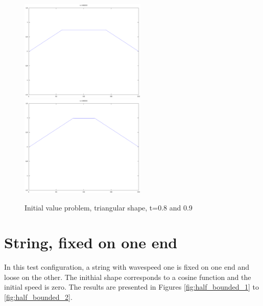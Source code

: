 \documentclass[a4paper,10pt]{report}
\begin{document}
\begin{figure}
 \includegraphics[width=6cm]{./fixed_ends_analytic_t1.800000.eps}
\includegraphics[width=6cm]{./fixed_ends_analytic_t1.900000.eps}

\caption{Initial value problem, triangular shape, t=0.8 and 0.9}
\label{fig:bounded_2}
\end{figure} 

\section{String, fixed on one end}
In this test configuration, a string with wavespeed one is fixed on one end and loose on the other. The inithial shape corresponds to a cosine function and the initial speed is zero. 
The results are presented in Figures \ref{fig:half_bounded_1} to \ref{fig:half_bounded_2}. 
\end{document}
